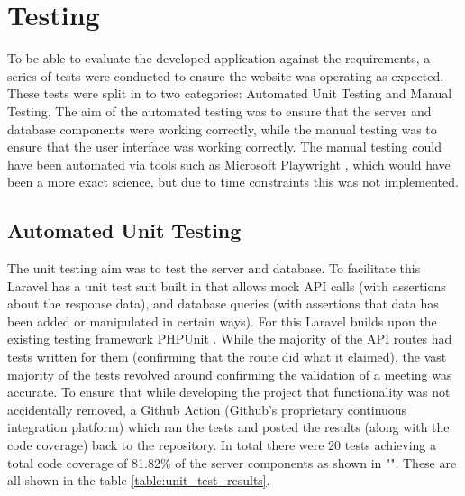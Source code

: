 \documentclass{UoYCSproject}
\begin{document}
\section{Testing}
To be able to evaluate the developed application against the requirements, a series of tests were conducted to ensure the website was operating as expected. These tests were split in to two categories: Automated Unit Testing and Manual Testing. The aim of the automated testing was to ensure that the server and database components were working correctly, while the manual testing was to ensure that the user interface was working correctly. The manual testing could have been automated via tools such as Microsoft Playwright \cite{microsoft_playwright}, which would have been a more exact science, but due to time constraints this was not implemented. 



\subsection{Automated Unit Testing}
The unit testing aim was to test the server and database. To facilitate this Laravel has a unit test suit built in that allows mock API calls (with assertions about the response data), and database queries (with assertions that data has been added or manipulated in certain ways). For this Laravel builds upon the existing testing framework PHPUnit \cite{phpunit}. While the majority of the API routes had tests written for them (confirming that the route did what it claimed), the vast majority of the tests revolved around confirming the validation of a meeting was accurate. To ensure that while developing the project that functionality was not accidentally removed, a Github Action (Github's proprietary continuous integration platform) which ran the tests and posted the results (along with the code coverage) back to the repository. In total there were 20 tests achieving a total code coverage of 81.82\% of the server components as shown in "". These are all shown in the table \ref{table:unit_test_results}.
\end{document}
